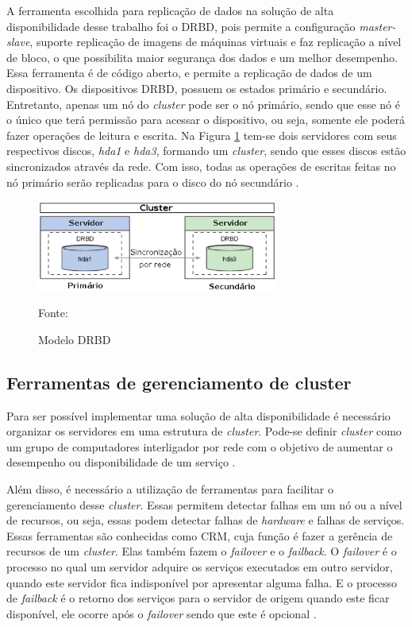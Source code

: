 A ferramenta escolhida para replicação de dados na solução de alta disponibilidade desse trabalho foi o \ac{DRBD}, pois permite a configuração 
\textit{master-slave}, suporte replicação de imagens de máquinas virtuais e faz replicação a nível de bloco, o que possibilita maior segurança
dos dados e um melhor desempenho.
Essa ferramenta é de código aberto, e permite a replicação de dados de um dispositivo. Os dispositivos \ac{DRBD}, possuem os estados primário 
e secundário. Entretanto, apenas um nó do \textit{cluster} pode ser o nó primário, sendo que esse nó é o único que terá permissão para acessar 
o dispositivo, ou seja, somente ele poderá fazer operações de leitura e escrita. Na Figura \ref{fig:drbd_basic} tem-se dois servidores com seus 
respectivos discos, \textit{hda1} e \textit{hda3}, formando um \textit{cluster}, sendo que esses discos estão sincronizados através da rede. 
Com isso, todas as operações de escritas feitas no nó primário serão replicadas para o disco do nó secundário \cite{zaminhani2008}.

\begin{figure}[h!]
 \centering
 \includegraphics[width=300px]{img/drbd_basic.eps}
 \caption{Modelo DRBD}
 Fonte: \citet{jones2010}
 \label{fig:drbd_basic}
\end{figure}

\subsection{Ferramentas de gerenciamento de cluster}
\label{section:toolcluster}

Para ser possível implementar uma solução de alta disponibilidade é necessário organizar os servidores em uma estrutura de \textit{cluster}.
Pode-se definir \textit{cluster} como um grupo de computadores interligador por rede com o objetivo de aumentar o desempenho ou disponibilidade
de um serviço \cite{freitas2005}.

Além disso, é necessário a utilização de ferramentas para facilitar o gerenciamento desse \textit{cluster}. Essas permitem detectar falhas em um 
nó ou a nível de recursos, ou seja, essas podem detectar falhas de \textit{hardware} e falhas de serviços. Essas ferramentas são conhecidas 
como \ac{CRM}, cuja função é fazer a gerência de recursos de um \textit{cluster}. Elas também fazem o \textit{failover} e o \textit{failback}.
O \textit{failover} é o processo no qual um servidor adquire os serviços executados em outro servidor, quando este servidor fica indisponível
por apresentar alguma falha. E o processo de \textit{failback} é o retorno dos serviços para o servidor de origem quando este ficar disponível, 
ele ocorre após o \textit{failover} sendo que este é opcional \cite{bassan2008}.

